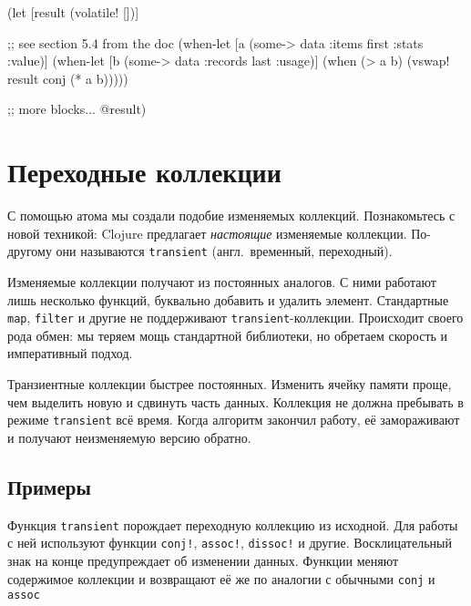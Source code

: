 \else

\begin{english}
  \begin{clojure}
(let [result (volatile! [])]

  ;; see section 5.4 from the doc
  (when-let [a (some-> data :items first :stats :value)]
    (when-let [b (some-> data :records last :usage)]
      (when (> a b)
        (vswap! result conj (* a b)))))

  ;; more blocks...
  @result)
  \end{clojure}
\end{english}

\fi

\section{Переходные коллекции}


С помощью атома мы создали подобие изменяемых коллекций. Познакомьтесь с новой
техникой: Clojure предлагает \emph{настоящие} изменяемые коллекции. По-другому
они называются \verb|transient| (англ.~временный, переходный).

Изменяемые коллекции получают из постоянных аналогов. С ними работают лишь
несколько функций, буквально добавить и удалить элемент. Стандартные \verb|map|,
\verb|filter| и другие не поддерживают \verb|transient|-коллекции. Происходит
своего рода обмен: мы теряем мощь стандартной библиотеки, но обретаем скорость и
императивный подход.

Транзиентные коллекции быстрее постоянных. Изменить ячейку памяти проще, чем
выделить новую и сдвинуть часть данных. Коллекция не должна пребывать в режиме
\verb|transient| всё время. Когда алгоритм закончил работу, её
замораживают и получают неизменяемую версию обратно.

\subsection{Примеры}

Функция \verb|transient| порождает переходную коллекцию из исходной. Для работы
с ней используют функции \verb|conj!|, \verb|assoc!|, \verb|dissoc!| и
другие. Восклицательный знак на конце предупреждает об изменении данных. Функции
меняют содержимое коллекции и возвращают её же по аналогии с обычными
\verb|conj| и \verb|assoc|


